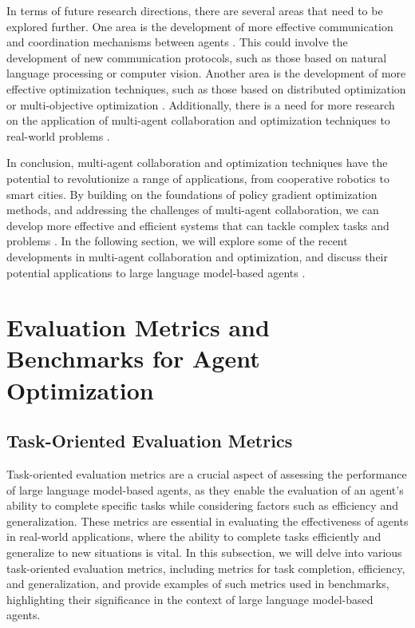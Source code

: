\documentclass[11pt]{article}
\begin{document}
In terms of future research directions, there are several areas that need to be explored further. One area is the development of more effective communication and coordination mechanisms between agents \cite{ref182}. This could involve the development of new communication protocols, such as those based on natural language processing or computer vision. Another area is the development of more effective optimization techniques, such as those based on distributed optimization or multi-objective optimization \cite{ref183}. Additionally, there is a need for more research on the application of multi-agent collaboration and optimization techniques to real-world problems \cite{ref184}.

In conclusion, multi-agent collaboration and optimization techniques have the potential to revolutionize a range of applications, from cooperative robotics to smart cities. By building on the foundations of policy gradient optimization methods, and addressing the challenges of multi-agent collaboration, we can develop more effective and efficient systems that can tackle complex tasks and problems \cite{ref185}. In the following section, we will explore some of the recent developments in multi-agent collaboration and optimization, and discuss their potential applications to large language model-based agents \cite{ref186}.

\section{Evaluation Metrics and Benchmarks for Agent Optimization}

\subsection{Task-Oriented Evaluation Metrics}

Task-oriented evaluation metrics are a crucial aspect of assessing the performance of large language model-based agents, as they enable the evaluation of an agent's ability to complete specific tasks while considering factors such as efficiency and generalization. These metrics are essential in evaluating the effectiveness of agents in real-world applications, where the ability to complete tasks efficiently and generalize to new situations is vital. In this subsection, we will delve into various task-oriented evaluation metrics, including metrics for task completion, efficiency, and generalization, and provide examples of such metrics used in benchmarks, highlighting their significance in the context of large language model-based agents.
\end{document}
